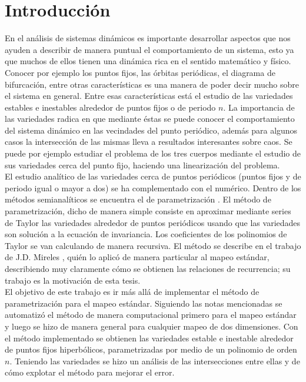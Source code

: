 
\chapter{Introducción}
En el análisis de sistemas dinámicos es importante desarrollar aspectos que nos ayuden a describir de manera puntual el comportamiento de un sistema, esto ya que muchos de ellos tienen una dinámica rica en el sentido matemático y físico. Conocer por ejemplo los puntos fijos, las órbitas periódicas, el diagrama de bifurcación, entre otras características es una manera de poder decir mucho sobre el sistema en general. Entre esas características está el estudio de las variedades estables e inestables alrededor de puntos fijos o de periodo $n$. La importancia de las variedades radica en que mediante éstas se puede conocer el comportamiento del sistema dinámico en las vecindades del punto periódico, además para algunos casos la intersección de las mismas lleva a resultados interesantes sobre caos. Se puede por ejemplo estudiar el problema de los tres cuerpos mediante el estudio de sus variedades cerca del punto fijo, haciendo una linearización del problema.\\


El estudio analítico de las variedades cerca de puntos periódicos (puntos fijos y de periodo igual o mayor a dos) se ha complementado con el numérico. Dentro de los métodos semianalíticos se encuentra el de parametrización \citep{Haro}. El método de parametrización, dicho de manera simple consiste en aproximar mediante series de Taylor las variedades alrededor de puntos periódicos usando que las variedades son solución a la ecuación de invariancia. Los coeficientes de los polinomios de Taylor se van calculando de manera recursiva. El método se describe en el trabajo de J.D. Mireles \citep{Mireles}, quién  lo aplicó de manera particular al mapeo estándar, describiendo muy claramente cómo se obtienen las relaciones de recurrencia; su trabajo es la motivación de esta tesis.\\


El objetivo de este trabajo es ir más allá de implementar el método de parametrización para el mapeo estándar. Siguiendo las notas mencionadas se automatizó el método de manera computacional primero para el mapeo estándar y luego se hizo de manera general para cualquier mapeo de dos dimensiones. Con el método implementado se obtienen las variedades estable e inestable alrededor de puntos fijos hiperbólicos, parametrizadas por medio de un polinomio de orden $n$.
Teniendo las variedades se hizo un análisis de las intersecciones entre ellas y de cómo explotar el método para mejorar el error.
 
